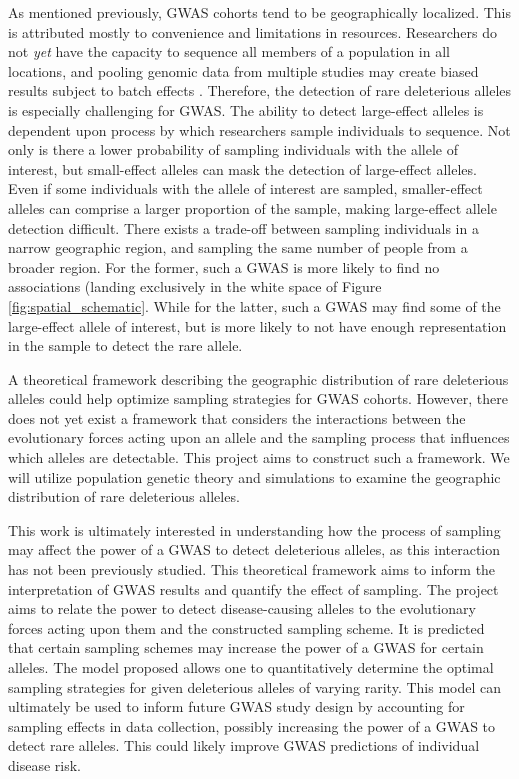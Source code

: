 As mentioned previously, GWAS cohorts tend to be geographically localized. This is attributed mostly to convenience and limitations in resources. Researchers do not \textit{yet} have the capacity to sequence all members of a population in all locations, and pooling genomic data from multiple studies may create biased results subject to batch effects \cite{woolston_potential_2015}\cite{gilad_reanalysis_2015}. Therefore, the detection of rare deleterious alleles is especially challenging for GWAS. The ability to detect large-effect alleles is dependent upon process by which researchers sample individuals to sequence. Not only is there a lower probability of sampling individuals with the allele of interest, but small-effect alleles can mask the detection of large-effect alleles. Even if some individuals with the allele of interest are sampled, smaller-effect alleles can comprise a larger proportion of the sample, making large-effect allele detection difficult. There exists a trade-off between sampling individuals in a narrow geographic region, and sampling the same number of people from a broader region. For the former, such a GWAS is more likely to find no associations (landing exclusively in the white space of Figure \ref{fig:spatial_schematic}. While for the latter, such a GWAS may find some of the large-effect allele of interest, but is more likely to not have enough representation in the sample to detect the rare allele. 


A theoretical framework describing the geographic distribution of rare deleterious alleles could help optimize sampling strategies for GWAS cohorts. However, there does not yet exist a framework that considers the interactions between the evolutionary forces acting upon an allele and the sampling process that influences which alleles are detectable. This project aims to construct such a framework. We will utilize population genetic theory and simulations to examine the geographic distribution of rare deleterious alleles. 


This work is ultimately interested in understanding how the process of sampling may affect the power of a GWAS to detect deleterious alleles, as this interaction has not been previously studied. This theoretical framework aims to inform the interpretation of GWAS results and quantify the effect of sampling. The project aims to relate the power to detect disease-causing alleles to the evolutionary forces acting upon them and the constructed sampling scheme. It is predicted that certain sampling schemes may increase the power of a GWAS for certain alleles. The model proposed allows one to quantitatively determine the optimal sampling strategies for given deleterious alleles of varying rarity. This model can ultimately be used to inform future GWAS study design by accounting for sampling effects in data collection, possibly increasing the power of a GWAS to detect rare alleles. This could likely improve GWAS predictions of individual disease risk.
